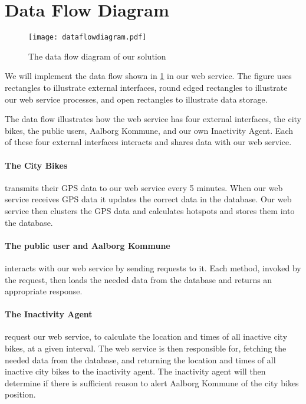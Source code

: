 \section{Data Flow Diagram}
 \begin{figure}[H]
\texttt{[image: dataflowdiagram.pdf]}
\caption{The data flow diagram of our solution}
\label{fig:dataFlowDiagram}
\end{figure}
\pagebreak

We will implement the data flow shown in \cref{fig:dataFlowDiagram} in our web service. The figure uses rectangles to illustrate external interfaces, round edged rectangles to illustrate our web service processes, and open rectangles to illustrate data storage.

The data flow illustrates how the web service has four external interfaces, the city bikes, the public users, Aalborg Kommune, and our own Inactivity Agent.
Each of these four external interfaces interacts and shares data with our web service.

\paragraph{The City Bikes} transmits their GPS data to our web service every 5 minutes. When our web service receives GPS data it updates the correct data in the database.
Our web service then clusters the GPS data and calculates hotspots and stores them into the database.

\paragraph{The public user and Aalborg Kommune} interacts with our web service by sending requests to it.
Each method, invoked by the request, then loads the needed data from the database and returns an appropriate response.

\paragraph{The Inactivity Agent} request our web service, to calculate the location and times of all inactive city bikes, at a given interval. The web service is then responsible for, fetching the needed data from the database, and returning the location and times of all inactive city bikes to the inactivity agent.
The inactivity agent will then determine if there is sufficient reason to alert Aalborg Kommune of the city bikes position.